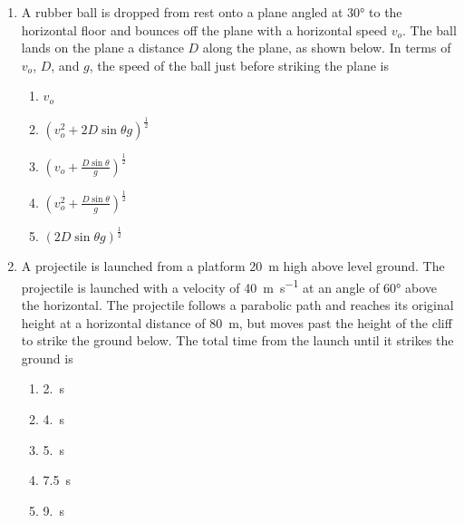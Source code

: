 \documentclass{../../../oss-apphys}
\begin{document}
\begin{multicols}{2}
\begin{enumerate}[resume,leftmargin=18pt]
%
    
  \item A rubber ball is dropped from rest onto a plane angled at \ang{30} to
    the horizontal floor and bounces off the plane with a horizontal speed
    $v_o$. The ball lands on the plane a distance $D$ along the plane, as shown
    below. In terms of $v_o$, $D$, and $g$, the speed of the ball just before
    striking the plane is
    \begin{center}
    \end{center}
    \begin{enumerate}[noitemsep,topsep=0pt,leftmargin=18pt,label=(\Alph*)]
    \item $v_o$
    \item $\displaystyle\left(v_o^2+2D\sin\theta g\right)^\frac{1}{2}$
    \item $\displaystyle\left(v_o+\frac{D\sin\theta}{g}\right)^\frac{1}{2}$
    \item $\displaystyle\left(v_o^2+\frac{D\sin\theta}{g}\right)^\frac{1}{2}$
    \item $\displaystyle\left(2D\sin\theta g\right)^\frac{1}{2}$
    \end{enumerate}
    \columnbreak
    
  \item A projectile is launched from a platform \SI{20}{\metre} high above
    level ground. The projectile is launched with a velocity of
    \SI{40}{\metre\per\second} at an angle of \ang{60} above the horizontal.
    The projectile follows a parabolic path and reaches its original height at
    a horizontal distance of \SI{80}{\metre}, but moves past the height of the
    cliff to strike the ground below. The total time from the launch until it
    strikes the ground is


    \begin{enumerate}[noitemsep,topsep=0pt,leftmargin=18pt,label=(\Alph*)]
    \item\SI{2.}{\second}
    \item\SI{4.}{\second}
    \item\SI{5.}{\second}
    \item\SI{7.5}{\second}
    \item\SI{9.}{\second}
    \end{enumerate}


\end{enumerate}
\end{multicols}
\end{document}
